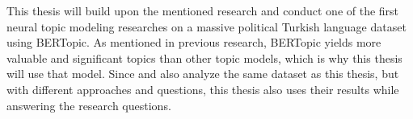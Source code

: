 This thesis will build upon the mentioned research and conduct one of the first 
neural topic modeling researches on a massive political Turkish language dataset using BERTopic. 
As mentioned in previous research, BERTopic yields more valuable and significant topics than 
other topic models, which is why this thesis will use that model.
Since \textcite{turkishbertweet_2023} and also \textcite{secim2023} analyze the same dataset 
as this thesis, but with different approaches and questions, this thesis also uses their 
results while answering the research questions.


